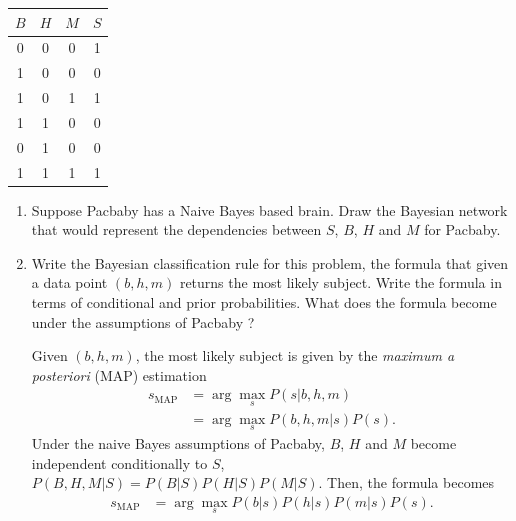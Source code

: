 \documentclass[11pt, a4paper]{article}
\begin{document}
\begin{table}[h]
    \centering
    \begin{tabular}{ccc|c}
        \toprule
        $B$ & $H$ & $M$ & $S$ \\
        \midrule
        0 & 0 & 0 & 1 \\
        1 & 0 & 0 & 0 \\
        1 & 0 & 1 & 1 \\
        1 & 1 & 0 & 0 \\
        0 & 1 & 0 & 0 \\
        1 & 1 & 1 & 1 \\
        \bottomrule
    \end{tabular}
\end{table}

\begin{enumerate}
    \item Suppose Pacbaby has a Naive Bayes based brain. Draw the Bayesian network that would represent the dependencies between $S$, $B$, $H$ and $M$ for Pacbaby.

    \begin{solution}
        \begin{figure}[H]
            \centering
        \end{figure}
    \end{solution}

    \item Write the Bayesian classification rule for this problem, \ie{} the formula that given a data point $(b, h, m)$ returns the most likely subject. Write the formula in terms of conditional and prior probabilities. What does the formula become under the assumptions of Pacbaby ?

    \begin{solution}
        Given $(b, h, m)$, the most likely subject is given by the \emph{maximum a posteriori} (MAP) estimation
        \begin{align*}
            s_{\text{MAP}} & = \arg\max_{s} P(s | b, h, m) \\
            & = \arg\max_{s} P(b, h, m | s) P(s) .
        \end{align*}
        Under the naive Bayes assumptions of Pacbaby, $B$, $H$ and $M$ become independent conditionally to $S$, \ie{} $P(B, H, M | S) = P(B | S) P(H | S) P(M | S)$. Then, the formula becomes
        \begin{align*}
            s_{\text{MAP}} & = \arg\max_{s} P(b | s) P(h | s) P(m | s) P(s) .
        \end{align*}
    \end{solution}


\end{enumerate}
\end{document}
